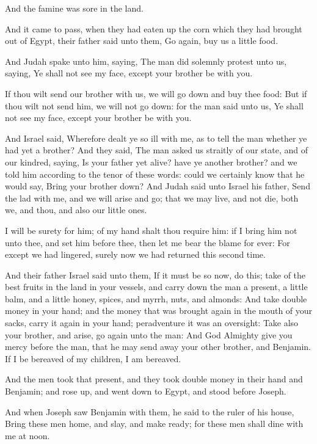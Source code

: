 \Chapter
\Verse And the famine was sore in the land.

\Verse And it came to pass, when they had eaten up the corn which they had brought out of Egypt, their father said unto them, Go again, buy us a little food.

\Verse And Judah spake unto him, saying, The man did solemnly protest unto us, saying, Ye shall not see my face, except your brother be with you.

\Verse If thou wilt send our brother with us, we will go down and buy thee food: \Verse But if thou wilt not send him, we will not go down: for the man said unto us, Ye shall not see my face, except your brother be with you.

\Verse And Israel said, Wherefore dealt ye so ill with me, as to tell the man whether ye had yet a brother?  \Verse And they said, The man asked us straitly of our state, and of our kindred, saying, Is your father yet alive? have ye another brother? and we told him according to the tenor of these words: could we certainly know that he would say, Bring your brother down?  \Verse And Judah said unto Israel his father, Send the lad with me, and we will arise and go; that we may live, and not die, both we, and thou, and also our little ones.

\Verse I will be surety for him; of my hand shalt thou require him: if I bring him not unto thee, and set him before thee, then let me bear the blame for ever: \Verse For except we had lingered, surely now we had returned this second time.

\Verse And their father Israel said unto them, If it must be so now, do this; take of the best fruits in the land in your vessels, and carry down the man a present, a little balm, and a little honey, spices, and myrrh, nuts, and almonds: \Verse And take double money in your hand; and the money that was brought again in the mouth of your sacks, carry it again in your hand; peradventure it was an oversight: \Verse Take also your brother, and arise, go again unto the man: \Verse And God Almighty give you mercy before the man, that he may send away your other brother, and Benjamin. If I be bereaved of my children, I am bereaved.

\Verse And the men took that present, and they took double money in their hand and Benjamin; and rose up, and went down to Egypt, and stood before Joseph.

\Verse And when Joseph saw Benjamin with them, he said to the ruler of his house, Bring these men home, and slay, and make ready; for these men shall dine with me at noon.

